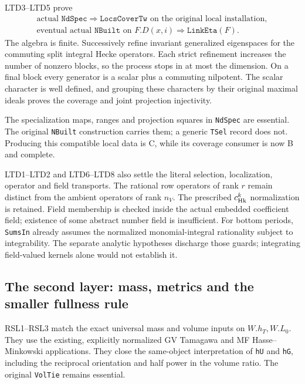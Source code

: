 LTD3--LTD5 prove
\[
\begin{gathered}
\text{actual }\texttt{NdSpec}
 \Longrightarrow\texttt{LocsCoverTw}\text{ on the original local installation},\\
\text{eventual actual }\texttt{NBuilt}\text{ on }F.D(x,i)
 \Longrightarrow\texttt{LinkEta}(F).
\end{gathered}                                                   \tag{AU31.7}
\]
The algebra is finite. Successively refine invariant generalized
eigenspaces for the commuting split integral Hecke operators.
Each strict refinement increases the number of nonzero blocks, so
the process stops in at most the dimension. On a final block every
generator is a scalar plus a commuting nilpotent. The scalar
character is well defined, and grouping these characters by their
original maximal ideals proves the coverage and joint projection
injectivity.

The specialization maps, ranges and projection squares in
\texttt{NdSpec} are essential. The original
\texttt{NBuilt} construction carries them; a generic \texttt{TSel}
record does not. Producing this compatible local data is C, while
its coverage consumer is now B and complete.

LTD1--LTD2 and LTD6--LTD8 also settle the literal selection,
localization, operator and field transports. The rational row
operators of rank $r$ remain distinct from the ambient operators
of rank $n_V$. The prescribed $c_{\rm Hk}^k$ normalization is
retained. Field membership is checked inside the actual embedded
coefficient field; existence of some abstract number field is
insufficient. For bottom periods, \texttt{SumsIn} already assumes
the normalized monomial-integral rationality subject to
integrability. The separate analytic hypotheses discharge those
guards; integrating field-valued kernels alone would not establish it.

\subsection{The second layer: mass, metrics and the smaller fullness rule}

RSL1--RSL3 match the exact universal mass and volume inputs on
$W.h_T,W.L_0$. They use the existing, explicitly normalized
GV Tamagawa and MF Hasse--Minkowski applications. They close the
same-object interpretation of \texttt{hU} and \texttt{hG}, including
the reciprocal orientation and half power in the volume ratio.
The original \texttt{VolTie} remains essential.

